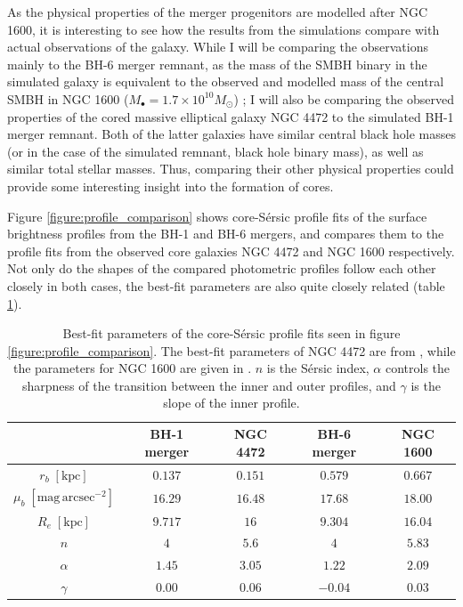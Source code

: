 \documentclass[english, oneside]{HYgradu}
\begin{document}
As the physical properties of the merger progenitors are modelled after NGC 1600, it is interesting to see how the results from the simulations compare with actual observations of the galaxy. While I will be comparing the observations mainly to the BH-6 merger remnant, as the mass of the SMBH binary in the simulated galaxy is equivalent to the observed and modelled mass of the central SMBH in NGC 1600 ($M_\bullet = 1.7 \times 10^{10} M_\odot$) \citep{Thomas2016}; I will also be comparing the observed properties of the cored massive elliptical galaxy NGC 4472 to the simulated BH-1 merger remnant. Both of the latter galaxies have similar central black hole masses (or in the case of the simulated remnant, black hole binary mass), as well as similar total stellar masses. Thus, comparing their other physical properties could provide some interesting insight into the formation of cores.

Figure \ref{figure:profile_comparison} shows core-Sérsic profile fits of the surface brightness profiles from the BH-1 and BH-6 mergers, and compares them to the profile fits from the observed core galaxies NGC 4472 and NGC 1600 respectively. Not only do the shapes of the compared photometric profiles follow each other closely in both cases, the best-fit parameters are also quite closely related (table \ref{table:bestfit_parameter_comparison}). 

\begin{table}
	\begin{center}
		\scriptsize
		\begin{tabular}{| c | c c | c c |}
		\hline
		 & BH-1 merger & NGC 4472 & BH-6 merger & NGC 1600 \\
		\hline
		$r_b \; \mathrm{[kpc]}$ & $0.137$ & $0.151$ & $0.579$ & $0.667$ \\
		$\mu_b \; \mathrm{[mag \, arcsec^{-2}]}$ & $16.29$ & $16.48$ & $17.68$ & $18.00$ \\
		$R_e \; \mathrm{[kpc]}$ & $9.717$ & $16$ & $9.304$ & $16.04$ \\
		$n$ & $4$ & $5.6$ & $4$ & $5.83$ \\
		$\alpha$ & $1.45$ & $3.05$ & $1.22$ & $2.09$ \\
		$\gamma$ & $0.00$ & $0.06$ & $-0.04$ & $0.03$ \\
		\hline
		\end{tabular}
	\end{center}
	\caption{Best-fit parameters of the core-Sérsic profile fits seen in figure \ref{figure:profile_comparison}. The best-fit parameters of NGC 4472 are from \cite{Rusli2013}, while the parameters for NGC 1600 are given in \cite{Thomas2016}. $n$ is the Sérsic index, $\alpha$ controls the sharpness of the transition between the inner and outer profiles, and $\gamma$ is the slope of the inner profile.}
	\label{table:bestfit_parameter_comparison}
\end{table}
\end{document}
